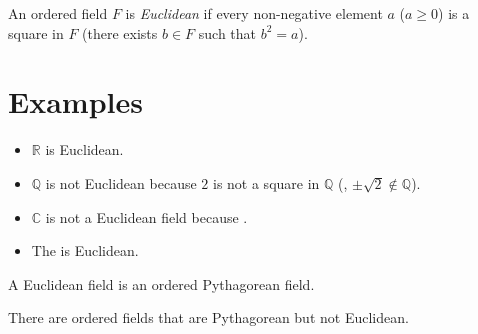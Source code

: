 \documentclass[12pt]{article}
\begin{document}

An ordered field $F$ is \emph{Euclidean} if every non-negative element $a$ ($a\geq0$) is a square in $F$ (there exists $b\in F$ such that $b^2=a$).

\section{Examples}
\begin{itemize}
\item
$\mathbb{R}$ is Euclidean.  
\item$\mathbb{Q}$ is not Euclidean because $2$ is not a square in $\mathbb{Q}$ (, $\pm\sqrt{2}\notin \mathbb{Q}$).
\item  $\mathbb{C}$ is not a Euclidean field because .
\item
The  is Euclidean.
\end{itemize}


A Euclidean field is an ordered Pythagorean field.
 
There are ordered fields that are Pythagorean but not Euclidean.
\end{document}
